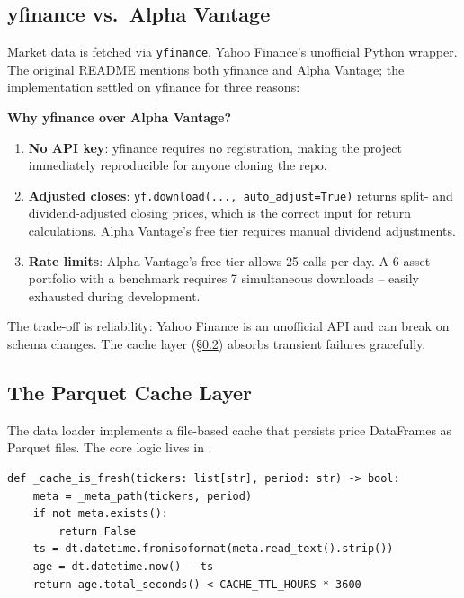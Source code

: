 
\subsection{yfinance vs.\ Alpha Vantage}

Market data is fetched via \texttt{yfinance}, Yahoo Finance's unofficial Python wrapper. The original README mentions both yfinance and Alpha Vantage; the implementation settled on yfinance for three reasons:

\begin{decisionbox}
  \textbf{Why yfinance over Alpha Vantage?}
  \begin{enumerate}
    \item \textbf{No API key}: yfinance requires no registration, making the project immediately reproducible for anyone cloning the repo.
    \item \textbf{Adjusted closes}: \texttt{yf.download(..., auto\_adjust=True)} returns split- and dividend-adjusted closing prices, which is the correct input for return calculations. Alpha Vantage's free tier requires manual dividend adjustments.
    \item \textbf{Rate limits}: Alpha Vantage's free tier allows 25 calls per day. A 6-asset portfolio with a benchmark requires 7 simultaneous downloads -- easily exhausted during development.
  \end{enumerate}
  The trade-off is reliability: Yahoo Finance is an unofficial API and can break on schema changes. The cache layer (\S\ref{sec:portfolio-cache}) absorbs transient failures gracefully.
\end{decisionbox}

\subsection{The Parquet Cache Layer}
\label{sec:portfolio-cache}

The data loader implements a file-based cache that persists price DataFrames as Parquet files. The core logic lives in .

\begin{lstlisting}[style=python, caption={Cache freshness check -- \filepath{data\_loader.py} lines 33--43}]
def _cache_is_fresh(tickers: list[str], period: str) -> bool:
    meta = _meta_path(tickers, period)
    if not meta.exists():
        return False
    ts = dt.datetime.fromisoformat(meta.read_text().strip())
    age = dt.datetime.now() - ts
    return age.total_seconds() < CACHE_TTL_HOURS * 3600
\end{lstlisting}

